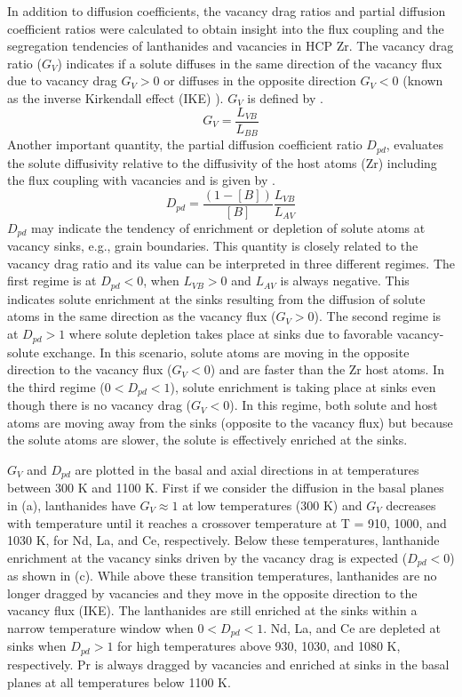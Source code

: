 \documentclass[preprint,12pt]{elsarticle}
\begin{document}
In addition to diffusion coefficients, the vacancy drag ratios and partial diffusion coefficient ratios were calculated to obtain insight into the flux coupling and the segregation tendencies of lanthanides and vacancies in HCP Zr. The vacancy drag ratio ($G_V$) indicates if a solute diffuses in the same direction of the vacancy flux due to vacancy drag $G_V > 0$ or diffuses in the opposite direction $G_V < 0$ (known as the inverse Kirkendall effect (IKE) \cite{marwick_segregation_1978}). $G_V$ is defined by .
\begin{equation}\label{eq:drag}
    G_V = \frac{L_{VB}}{L_{BB}}
\end{equation}
Another important quantity, the partial diffusion coefficient ratio $D_{pd}$, evaluates the solute diffusivity relative to the diffusivity of the host atoms (Zr) including the flux coupling with vacancies and is given by .
\begin{equation}\label{eq:pdc}
    D_{pd} = \frac{(1-[B])}{[B]} \frac{L_{VB}}{L_{AV}}
\end{equation}
$D_{pd}$ may indicate the tendency of enrichment or depletion of solute atoms at vacancy sinks, e.g., grain boundaries. This quantity is closely related to the vacancy drag ratio and its value can be interpreted in three different regimes. The first regime is at $D_{pd} < 0$, when $L_{VB} > 0$ and $L_{AV}$ is always negative. This indicates solute enrichment at the sinks resulting from the diffusion of solute atoms in the same direction as the vacancy flux ($G_V > 0$). The second regime is at $D_{pd} > 1$ where solute depletion takes place at sinks due to favorable vacancy-solute exchange. In this scenario, solute atoms are moving in the opposite direction to the vacancy flux ($G_V < 0$) and are faster than the Zr host atoms. In the third regime ($0 < D_{pd} < 1$), solute enrichment is taking place at sinks even though there is no vacancy drag ($G_V < 0$). In this regime, both solute and host atoms are moving away from the sinks (opposite to the vacancy flux) but because the solute atoms are slower, the solute is effectively enriched at the sinks. 

$G_V$ and $D_{pd}$ are plotted in the basal and axial directions in  at temperatures between 300 K and 1100 K. First if we consider the diffusion in the basal planes in (a), lanthanides have $G_V \approx 1$ at low temperatures (300 K) and $G_V$ decreases with temperature until it reaches a crossover temperature at T = 910, 1000, and 1030 K, for Nd, La, and Ce, respectively. Below these temperatures, lanthanide enrichment at the vacancy sinks driven by the vacancy drag is expected ($D_{pd} < 0$) as shown in (c). While above these transition temperatures, lanthanides are no longer dragged by vacancies and they move in the opposite direction to the vacancy flux (IKE). The lanthanides are still enriched at the sinks within a narrow temperature window when $ 0 < D_{pd} < 1$. Nd, La, and Ce are depleted at sinks when $ D_{pd} > 1$ for high temperatures above 930, 1030, and 1080 K, respectively.
Pr is always dragged by vacancies and enriched at sinks in the basal planes at all temperatures below 1100 K.
\end{document}
